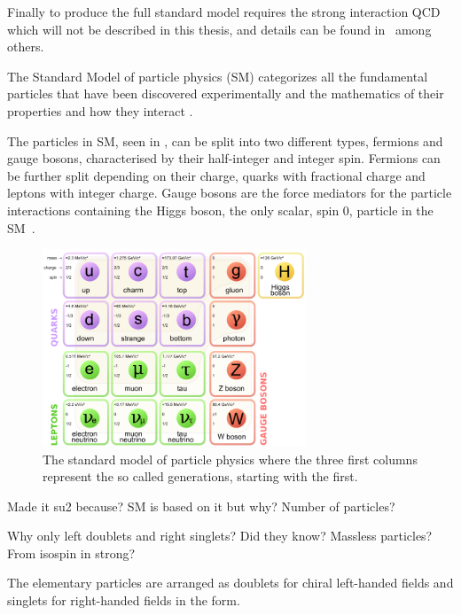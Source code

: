 
Finally to produce the full standard model requires the strong interaction QCD which will not be described in this thesis, and details can be found in~\cite{13PDG} among others. 

The Standard Model of particle physics (SM) categorizes all the fundamental particles that have been discovered experimentally and the mathematics of their properties and how they interact \cite{32Burchan:1995, 38griffiths}. 

The particles in SM, seen in , can be split into two different types, fermions and gauge bosons, characterised by their half-integer and integer spin. Fermions can be further split depending on their charge, quarks with fractional charge and leptons with integer charge. Gauge bosons are the force mediators for the particle interactions containing the Higgs boson, the only scalar, spin 0, particle in the SM~\cite{35Higgs}.

\begin{figure}[h!]
\includegraphics[width=0.7\textwidth]{figures/Standard_Model_of_Elementary_Particles.png}
\caption{The standard model of particle physics where the three first columns represent the so called generations, starting with the first. \cite{33wiki1:Online}}
\label{fig:standardModel}
\end{figure}

Made it su2  because? SM is based on it but why? Number of particles?

Why only left doublets and right singlets? Did they know? Massless particles? From isospin in strong?

The elementary particles are arranged as doublets for chiral left-handed fields and singlets for right-handed fields in the form.

